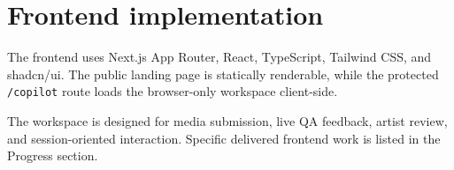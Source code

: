 \section{Frontend implementation}
The frontend uses Next.js App Router, React, TypeScript, Tailwind CSS, and shadcn/ui. The public landing page is statically renderable, while the protected \texttt{/copilot} route loads the browser-only workspace client-side.

The workspace is designed for media submission, live QA feedback, artist review, and session-oriented interaction. Specific delivered frontend work is listed in the Progress section.
